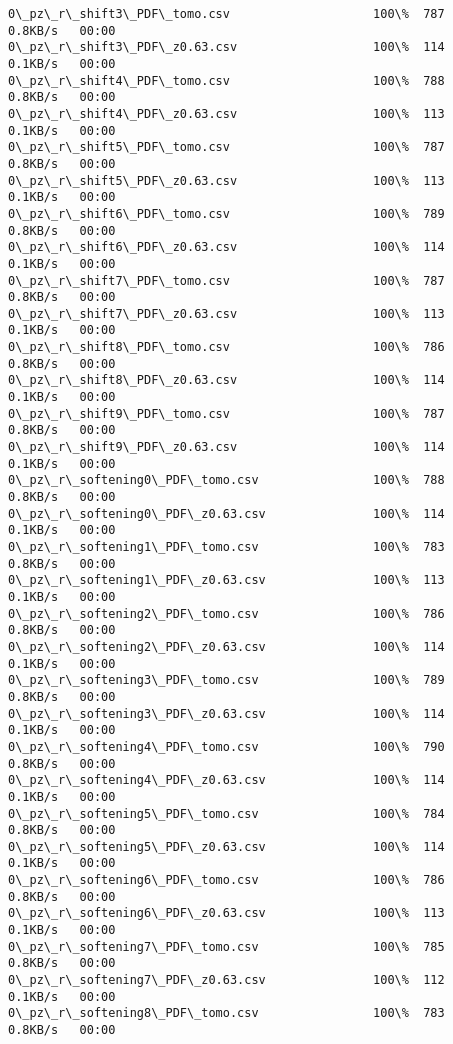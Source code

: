 \documentclass[11pt]{article}
\begin{document}
\begin{Verbatim}[commandchars=\\\{\}]
0\_pz\_r\_shift3\_PDF\_tomo.csv                    100\%  787     0.8KB/s   00:00    
0\_pz\_r\_shift3\_PDF\_z0.63.csv                   100\%  114     0.1KB/s   00:00    
0\_pz\_r\_shift4\_PDF\_tomo.csv                    100\%  788     0.8KB/s   00:00    
0\_pz\_r\_shift4\_PDF\_z0.63.csv                   100\%  113     0.1KB/s   00:00    
0\_pz\_r\_shift5\_PDF\_tomo.csv                    100\%  787     0.8KB/s   00:00    
0\_pz\_r\_shift5\_PDF\_z0.63.csv                   100\%  113     0.1KB/s   00:00    
0\_pz\_r\_shift6\_PDF\_tomo.csv                    100\%  789     0.8KB/s   00:00    
0\_pz\_r\_shift6\_PDF\_z0.63.csv                   100\%  114     0.1KB/s   00:00    
0\_pz\_r\_shift7\_PDF\_tomo.csv                    100\%  787     0.8KB/s   00:00    
0\_pz\_r\_shift7\_PDF\_z0.63.csv                   100\%  113     0.1KB/s   00:00    
0\_pz\_r\_shift8\_PDF\_tomo.csv                    100\%  786     0.8KB/s   00:00    
0\_pz\_r\_shift8\_PDF\_z0.63.csv                   100\%  114     0.1KB/s   00:00    
0\_pz\_r\_shift9\_PDF\_tomo.csv                    100\%  787     0.8KB/s   00:00    
0\_pz\_r\_shift9\_PDF\_z0.63.csv                   100\%  114     0.1KB/s   00:00    
0\_pz\_r\_softening0\_PDF\_tomo.csv                100\%  788     0.8KB/s   00:00    
0\_pz\_r\_softening0\_PDF\_z0.63.csv               100\%  114     0.1KB/s   00:00    
0\_pz\_r\_softening1\_PDF\_tomo.csv                100\%  783     0.8KB/s   00:00    
0\_pz\_r\_softening1\_PDF\_z0.63.csv               100\%  113     0.1KB/s   00:00    
0\_pz\_r\_softening2\_PDF\_tomo.csv                100\%  786     0.8KB/s   00:00    
0\_pz\_r\_softening2\_PDF\_z0.63.csv               100\%  114     0.1KB/s   00:00    
0\_pz\_r\_softening3\_PDF\_tomo.csv                100\%  789     0.8KB/s   00:00    
0\_pz\_r\_softening3\_PDF\_z0.63.csv               100\%  114     0.1KB/s   00:00    
0\_pz\_r\_softening4\_PDF\_tomo.csv                100\%  790     0.8KB/s   00:00    
0\_pz\_r\_softening4\_PDF\_z0.63.csv               100\%  114     0.1KB/s   00:00    
0\_pz\_r\_softening5\_PDF\_tomo.csv                100\%  784     0.8KB/s   00:00    
0\_pz\_r\_softening5\_PDF\_z0.63.csv               100\%  114     0.1KB/s   00:00    
0\_pz\_r\_softening6\_PDF\_tomo.csv                100\%  786     0.8KB/s   00:00    
0\_pz\_r\_softening6\_PDF\_z0.63.csv               100\%  113     0.1KB/s   00:00    
0\_pz\_r\_softening7\_PDF\_tomo.csv                100\%  785     0.8KB/s   00:00    
0\_pz\_r\_softening7\_PDF\_z0.63.csv               100\%  112     0.1KB/s   00:00    
0\_pz\_r\_softening8\_PDF\_tomo.csv                100\%  783     0.8KB/s   00:00    

\end{Verbatim}
\end{document}
